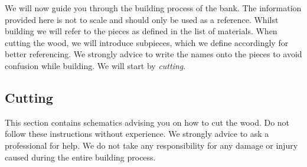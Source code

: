 \documentclass{subfiles}
\begin{document}
    We will now guide you through the building process of the bank. The information provided here is not to scale and should only be used as a reference. Whilst building we will refer to the pieces as defined in the list of materials. When cutting the wood, we will introduce subpieces, which we define accordingly for better referencing. We strongly advice to write the names onto the pieces to avoid confusion while building. We will start by \emph{cutting}.

    \subsection{Cutting}
        This section contains schematics advising you on how to cut the wood. Do not follow these instructions without experience. We strongly advice to ask a professional for help. We do not take any responsibility for any damage or injury caused during the entire building process.
\end{document}

